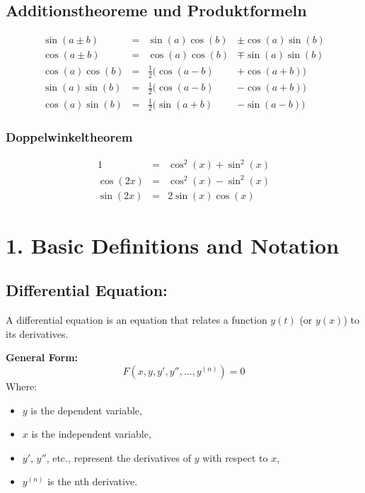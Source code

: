 \documentclass[../Main.tex]{subfiles}
\begin{document}
\subsection{Additionstheoreme und Produktformeln}
\begin{equation}
    \begin{aligned}
        \sin(a \pm b) &= &\sin(a) \cos(b) &\pm \cos(a) \sin(b) \\
        \cos(a \pm b) &= &\cos(a)\cos(b) &\mp \sin(a) \sin(b) \\
        \cos(a) \cos(b) &= &\frac{1}{2}(\cos(a-b) &+ \cos(a+b)) \\
        \sin(a) \sin(b) &= &\frac{1}{2}(\cos(a-b) &- \cos(a+b)) \\
        \cos(a) \sin(b) &= &\frac{1}{2}(\sin(a+b) &- \sin(a-b))
    \end{aligned}
\end{equation}
\subsubsection{Doppelwinkeltheorem}
\begin{equation}
    \begin{aligned}
        1 &= &\cos^2(x)+\sin^2(x) \\
        \cos(2x) &= &\cos^2(x)-\sin^2(x)\\
        \sin(2x) &= &2\sin(x)\cos(x)
    \end{aligned}
\end{equation}

\section*{1. Basic Definitions and Notation}

\subsection*{Differential Equation:}
A differential equation is an equation that relates a function \( y(t) \) (or \( y(x) \)) to its derivatives.

\textbf{General Form:}
\[
F(x, y, y', y'', \dots, y^{(n)}) = 0
\]
Where:
\begin{itemize}
    \item \( y \) is the dependent variable,
    \item \( x \) is the independent variable,
    \item \( y' \), \( y'' \), etc., represent the derivatives of \( y \) with respect to \( x \),
    \item \( y^{(n)} \) is the nth derivative.
\end{itemize}
\end{document}
